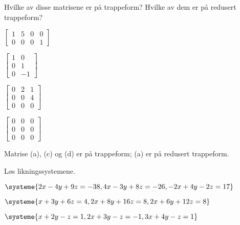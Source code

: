 
\begin{oppgave}
Hvilke av disse matrisene er på trappeform?  Hvilke av dem er på
redusert trappeform?
\begin{punkt}
$
\begin{bmatrix}
1 & 5 & 0 & 0 \\
0 & 0 & 0 & 1
\end{bmatrix}
$
\end{punkt}
\begin{punkt}
$
\begin{bmatrix}
1 & 0 \\
0 & 1 \\
0 & -1
\end{bmatrix}
$
\end{punkt}
\begin{punkt}
$
\begin{bmatrix}
0 & 2 & 1 \\
0 & 0 & 4 \\
0 & 0 & 0
\end{bmatrix}
$
\end{punkt}
\begin{punkt}
$
\begin{bmatrix}
0 & 0 & 0 \\
0 & 0 & 0 \\
0 & 0 & 0
\end{bmatrix}
$
\end{punkt}
\end{oppgave}
\begin{losning}
Matrise (a), (c) og (d) er på trappeform; (a) er på redusert trappeform.
\end{losning}

\begin{oppgave}
Løs likningssystemene.
\begin{punkt}
$
\systeme{
  2x - 4y + 9z = -38,
  4x - 3y + 8z = -26,
 -2x + 4y - 2z =  17
}
$
\end{punkt}
\begin{punkt}
$
\systeme{
  x + 3y +  6z = 4,
 2x + 8y + 16z = 8,
 2x + 6y + 12z = 8
}
$
\end{punkt}
\begin{punkt}
$
\systeme{
	x  + 2y - z = 1,
	2x + 3y - z = -1,
	3x + 4y - z = 1
}
$
\end{punkt}
\end{oppgave}

